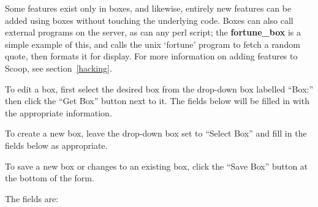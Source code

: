 Some features exist only in boxes, and likewise, entirely new features can be added using boxes without touching the underlying code. Boxes can also call external programs on the server, as can any perl script; the {\bf fortune\_box} is a simple example of this, and calls the unix `fortune' program to fetch a random quote, then formats it for display. For more information on adding features to Scoop, see section~\ref{hacking}.

To edit a box, first select the desired box from the drop-down box labelled ``Box:'' then click the ``Get Box'' button next to it. The fields below will be filled in with the appropriate information.

To create a new box, leave the drop-down box set to ``Select Box'' and fill in the fields below as appropriate.

To save a new box or changes to an existing box, click the ``Save Box'' button at the bottom of the form.

The fields are:

